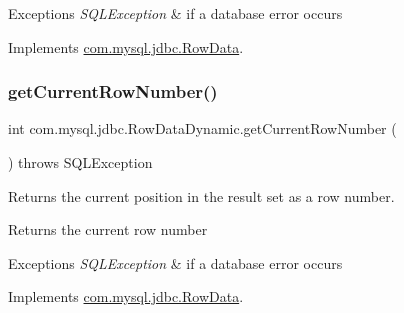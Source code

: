 \begin{DoxyExceptions}{Exceptions}
{\em S\+Q\+L\+Exception} & if a database error occurs \\
\hline
\end{DoxyExceptions}


Implements \mbox{\hyperlink{interfacecom_1_1mysql_1_1jdbc_1_1_row_data_a25cc7589897136ff05959212ce3e9063}{com.\+mysql.\+jdbc.\+Row\+Data}}.

\mbox{\label{classcom_1_1mysql_1_1jdbc_1_1_row_data_dynamic_a41a9e435a520104e0e4ff6d89717702d}} 
\subsubsection{\texorpdfstring{get\+Current\+Row\+Number()}{getCurrentRowNumber()}}
{\footnotesize\ttfamily int com.\+mysql.\+jdbc.\+Row\+Data\+Dynamic.\+get\+Current\+Row\+Number (\begin{DoxyParamCaption}{ }\end{DoxyParamCaption}) throws S\+Q\+L\+Exception}

Returns the current position in the result set as a row number.

\begin{DoxyReturn}{Returns}
the current row number 
\end{DoxyReturn}

\begin{DoxyExceptions}{Exceptions}
{\em S\+Q\+L\+Exception} & if a database error occurs \\
\hline
\end{DoxyExceptions}


Implements \mbox{\hyperlink{interfacecom_1_1mysql_1_1jdbc_1_1_row_data_aec8ec45fafa52ded12507aa708efbdf7}{com.\+mysql.\+jdbc.\+Row\+Data}}.

\mbox{\label{classcom_1_1mysql_1_1jdbc_1_1_row_data_dynamic_af879dc010e19afaf62c037d9cfca5c8f}} 
